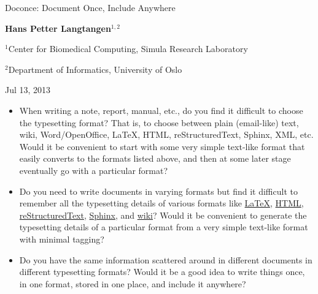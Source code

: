 \documentclass[%
oneside,                 %
final,                   %
10pt]{article}
\begin{document}




\begin{center}
{\LARGE\bf
\begin{spacing}{1.25}
Doconce: Document Once, Include Anywhere
\end{spacing}
}
\end{center}


\begin{center}
{\bf Hans Petter Langtangen${}^{1, 2}$} \\ [0mm]
\end{center}

\begin{center}
\centerline{{\small ${}^1$Center for Biomedical Computing, Simula Research Laboratory}}
\centerline{{\small ${}^2$Department of Informatics, University of Oslo}}
\end{center}


\begin{center}
Jul 13, 2013
\end{center}

\vspace{1cm}



\begin{itemize}
 \item When writing a note, report, manual, etc., do you find it difficult
   to choose the typesetting format? That is, to choose between plain
   (email-like) text, wiki, Word/OpenOffice, {\LaTeX}, HTML,
   reStructuredText, Sphinx, XML, etc.  Would it be convenient to
   start with some very simple text-like format that easily converts
   to the formats listed above, and then at some later stage
   eventually go with a particular format?

 \item Do you need to write documents in varying formats but find it
   difficult to remember all the typesetting details of various
   formats like \href{{http://refcards.com/docs/silvermanj/amslatex/LaTeXRefCard.v2.0.pdf}}{LaTeX}, \href{{http://www.htmlcodetutorial.com/}}{HTML}, \href{{http://docutils.sourceforge.net/docs/ref/rst/restructuredtext.html}}{reStructuredText}, \href{{http://sphinx.pocoo.org/contents.html}}{Sphinx}, and \href{{http://code.google.com/p/support/wiki/WikiSyntax}}{wiki}? Would it be convenient
   to generate the typesetting details of a particular format from a
   very simple text-like format with minimal tagging?

 \item Do you have the same information scattered around in different
   documents in different typesetting formats? Would it be a good idea
   to write things once, in one format, stored in one place, and
   include it anywhere?
\end{itemize}
\end{document}
